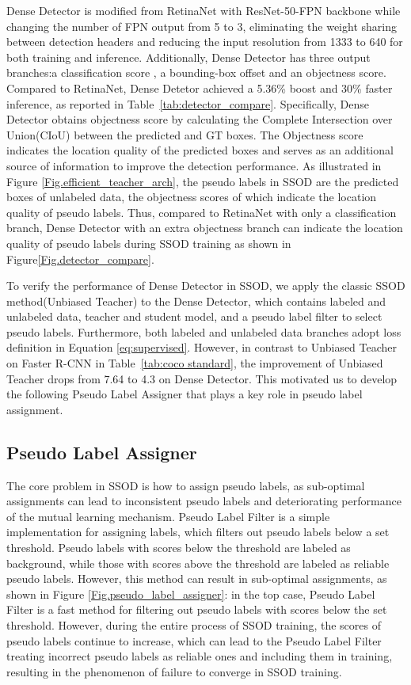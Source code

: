 \documentclass[10pt,twocolumn,letterpaper]{article}
\begin{document}
Dense Detector is modified from RetinaNet with ResNet-50-FPN backbone while changing the number of FPN output from 5 to 3, eliminating the weight sharing between detection headers and reducing the input resolution from 1333 to 640 for both training and inference. Additionally, Dense Detector has three output branches:a classification score , a bounding-box offset and an objectness score. Compared to RetinaNet, Dense Detetor achieved a 5.36\%  boost and 30\% faster inference, as reported in Table~\ref{tab:detector_compare}. Specifically, Dense Detector obtains objectness score by calculating the Complete Intersection over Union(CIoU)\cite{zheng2021enhancing} between the predicted and GT boxes. The Objectness score indicates the location quality of the predicted boxes and serves as an additional source of information to improve the detection performance. As illustrated in Figure \ref{Fig.efficient_teacher_arch}, the pseudo labels in SSOD are the predicted boxes of unlabeled data, the objectness scores of which indicate the location quality of pseudo labels. Thus, compared to RetinaNet with only a classification branch, Dense Detector with an extra objectness branch can indicate the location quality of pseudo labels during SSOD training as shown in Figure\ref{Fig.detector_compare}.



To verify the performance of Dense Detector in SSOD, we apply the classic SSOD method(Unbiased Teacher\cite{liu2021unbiased}) to the Dense Detector, which contains labeled and unlabeled data, teacher and student model, and a pseudo label filter to select pseudo labels. Furthermore, both labeled and unlabeled data branches adopt loss definition in Equation \ref{eq:supervised}.
However, in contrast to Unbiased Teacher on Faster R-CNN in Table~\ref{tab:coco standard}, the  improvement of Unbiased Teacher drops from 7.64 to 4.3 on Dense Detector. This motivated us to develop the following Pseudo Label Assigner that plays a key role in pseudo label assignment.

\subsection{Pseudo Label Assigner}
The core problem in SSOD is how to assign pseudo labels, as sub-optimal assignments can lead to inconsistent pseudo labels and deteriorating performance of the mutual learning mechanism. Pseudo Label Filter is a simple implementation for assigning labels, which filters out pseudo labels below a set threshold. Pseudo labels with scores below the threshold are labeled as background, while those with scores above the threshold are labeled as reliable pseudo labels. However, this method can result in sub-optimal assignments, as shown in Figure \ref{Fig.pseudo_label_assigner}: in the top case, Pseudo Label Filter is a fast method for filtering out pseudo labels with scores below the set threshold. However, during the entire process of SSOD training, the scores of pseudo labels continue to increase, which can lead to the Pseudo Label Filter treating incorrect pseudo labels as reliable ones and including them in training, resulting in the phenomenon of failure to converge in SSOD training.
\end{document}
